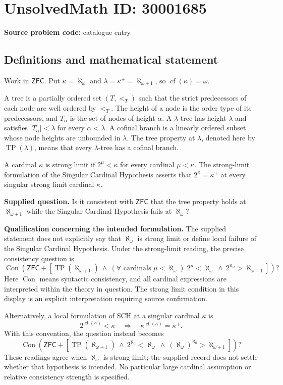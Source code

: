 \documentclass[11pt]{article}
\begin{document}
\section*{UnsolvedMath ID: 30001685}
\textbf{Source problem code:} catalogue entry
\subsection{Definitions and mathematical statement}
Work in \(\mathsf{ZFC}\). Put \(\kappa=\aleph_\omega\) and \(\lambda=\kappa^+=\aleph_{\omega+1}\), so \(\operatorname{cf}(\kappa)=\omega\).

A tree is a partially ordered set \((T,<_{T})\) such that the strict predecessors of each node are well ordered by \(<_{T}\). The height of a node is the order type of its predecessors, and \(T_\alpha\) is the set of nodes of height \(\alpha\). A \(\lambda\)-tree has height \(\lambda\) and satisfies \(|T_\alpha|<\lambda\) for every \(\alpha<\lambda\). A cofinal branch is a linearly ordered subset whose node heights are unbounded in \(\lambda\). The tree property at \(\lambda\), denoted here by \(\operatorname{TP}(\lambda)\), means that every \(\lambda\)-tree has a cofinal branch.

A cardinal \(\kappa\) is strong limit if \(2^\mu<\kappa\) for every cardinal \(\mu<\kappa\). The strong-limit formulation of the Singular Cardinal Hypothesis asserts that \(2^\kappa=\kappa^+\) at every singular strong limit cardinal \(\kappa\).

\textbf{Supplied question.} Is it consistent with \(\mathsf{ZFC}\) that the tree property holds at \(\aleph_{\omega+1}\) while the Singular Cardinal Hypothesis fails at \(\aleph_\omega\)?

\textbf{Qualification concerning the intended formulation.} The supplied statement does not explicitly say that \(\aleph_\omega\) is strong limit or define local failure of the Singular Cardinal Hypothesis. Under the strong-limit reading, the precise consistency question is
\[
\operatorname{Con}\!\left(\mathsf{ZFC}+\left[
\operatorname{TP}(\aleph_{\omega+1})\ \land\
(\forall\text{ cardinals }\mu<\aleph_\omega)\;2^\mu<\aleph_\omega\ \land\
2^{\aleph_\omega}>\aleph_{\omega+1}
\right]\right)?
\]
Here \(\operatorname{Con}\) means syntactic consistency, and all cardinal expressions are interpreted within the theory in question. The strong limit condition in this display is an explicit interpretation requiring source confirmation.

Alternatively, a local formulation of SCH at a singular cardinal \(\kappa\) is
\[
2^{\operatorname{cf}(\kappa)}<\kappa
\quad\Longrightarrow\quad
\kappa^{\operatorname{cf}(\kappa)}=\kappa^+.
\]
With this convention, the question instead becomes
\[
\operatorname{Con}\!\left(\mathsf{ZFC}+\left[
\operatorname{TP}(\aleph_{\omega+1})\ \land\
2^{\aleph_0}<\aleph_\omega\ \land\
(\aleph_\omega)^{\aleph_0}>\aleph_{\omega+1}
\right]\right)?
\]
These readings agree when \(\aleph_\omega\) is strong limit; the supplied record does not settle whether that hypothesis is intended. No particular large cardinal assumption or relative consistency strength is specified.
\end{document}
